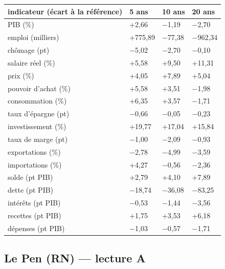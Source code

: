 \documentclass[
  11pt,
  11pt,
  a4paper,
  openany]{book}
\begin{document}
\begin{longtable}[]{@{}llll@{}}
\toprule\noalign{}
indicateur (écart à la référence) & 5 ans & 10 ans & 20 ans \\
\midrule\noalign{}
\endhead
\bottomrule\noalign{}
\endlastfoot
PIB (\%) & +2,66 & −1,19 & −2,70 \\
emploi (milliers) & +775,89 & −77,38 & −962,34 \\
chômage (pt) & −5,02 & −2,70 & −0,10 \\
salaire réel (\%) & +5,58 & +9,50 & +11,31 \\
prix (\%) & +4,05 & +7,89 & +5,04 \\
pouvoir d'achat (\%) & +5,58 & +3,51 & −1,98 \\
consommation (\%) & +6,35 & +3,57 & −1,71 \\
taux d'épargne (pt) & −0,66 & −0,05 & −0,23 \\
investissement (\%) & +19,77 & +17,04 & +15,84 \\
taux de marge (pt) & −1,00 & −2,09 & −0,93 \\
exportations (\%) & −2,78 & −4,99 & −3,59 \\
importations (\%) & +4,27 & −0,56 & −2,36 \\
solde (pt PIB) & +2,79 & +4,10 & +7,89 \\
dette (pt PIB) & −18,74 & −36,08 & −83,25 \\
intérêts (pt PIB) & −0,53 & −1,44 & −3,56 \\
recettes (pt PIB) & +1,75 & +3,53 & +6,18 \\
dépenses (pt PIB) & −1,03 & −0,57 & −1,71 \\
\end{longtable}

\hypertarget{le-pen-rn-lecture-a}{%
\subsection{Le Pen (RN) --- lecture A}\label{le-pen-rn-lecture-a}}
\end{document}

